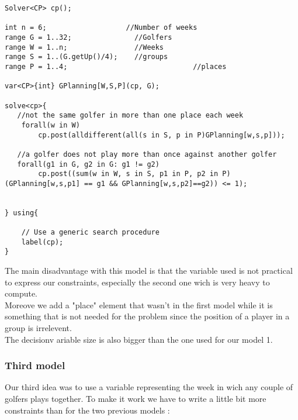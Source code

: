 \documentclass{eplDoc}
\begin{document}
\begin{lstlisting}
Solver<CP> cp();

int n = 6;                   //Number of weeks
range G = 1..32;               //Golfers
range W = 1..n;                //Weeks
range S = 1..(G.getUp()/4);    //groups
range P = 1..4;								 //places

var<CP>{int} GPlanning[W,S,P](cp, G);   

solve<cp>{
   //not the same golfer in more than one place each week
    forall(w in W)
        cp.post(alldifferent(all(s in S, p in P)GPlanning[w,s,p]));
    
   //a golfer does not play more than once against another golfer
   forall(g1 in G, g2 in G: g1 != g2)
        cp.post((sum(w in W, s in S, p1 in P, p2 in P) (GPlanning[w,s,p1] == g1 && GPlanning[w,s,p2]==g2)) <= 1); 


} using{

    // Use a generic search procedure
    label(cp);
}
\end{lstlisting}

The main disadvantage with this model is that the variable used is not practical to express our constraints, especially the second one wich is very heavy to compute. \\ 
Moreove we add a "place" element that wasn't in the first model while it is something that is not needed for the problem since the position of a player in a group is irrelevent. \\ 
The decisionv ariable size is also bigger than the one used for our model 1. 

\subsubsection{Third model}

Our third idea was to use a variable representing the week in wich any couple of golfers plays together. To make it work we have to write a little bit more constraints than for the two previous models :  
\end{document}
